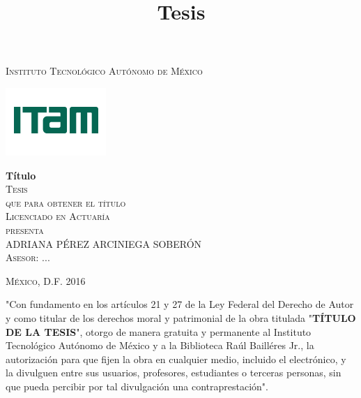 \documentclass[letterpaper,oneside,11pt,review]{book}
\theoremstyle{plain}
\begin{document}
\pagestyle{empty} %

\title{Tesis} %

\begin{titlepage}
\begin{center}

\textsc{\Large Instituto Tecnol\'ogico Aut\'onomo de M\'exico}\\[4em]

\begin{center}
	\includegraphics{DocumentosLaTex/ITAM_2016}
\end{center}

\vspace{4em}

{\sc \huge {\bf T\'itulo}}\\[4em]

\textsc{\large Tesis}\\[1em]

\textsc{que para obtener el t\'itulo}\\[1em]

\textsc{Licenciado en Actuar\'ia}\\[1em]

\textsc{presenta}\\[1em]

\textsc{\Large ADRIANA P\'EREZ ARCINIEGA SOBER\'ON }\\[1em]

\textsc{\large Asesor: ...}

\end{center}

\vspace*{\fill}
\textsc{M\'exico, D.F. \hspace*{\fill} 2016}

\end{titlepage}


\thispagestyle{empty}
\vspace*{\fill}
\begingroup
"Con fundamento en los art\'iculos 21 y 27 de la Ley Federal del Derecho de Autor y como titular de los derechos moral y patrimonial de la obra titulada "\textbf{T\'ITULO DE LA TESIS}", otorgo de manera gratuita y permanente al Instituto Tecnol\'ogico Aut\'onomo de M\'exico y a la Biblioteca Ra\'ul Baill\'eres Jr., la autorizaci\'on para que fijen la obra en cualquier medio, incluido el electr\'onico, y la divulguen entre sus usuarios, profesores, estudiantes o terceras personas, sin que pueda percibir por tal divulgaci\'on una contraprestaci\'on".
\end{document}
